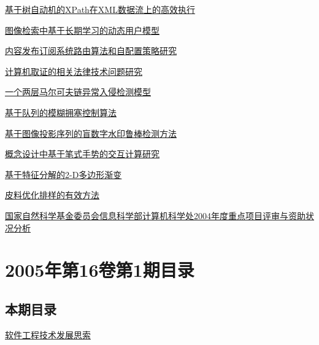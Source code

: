 \documentclass[a4paper]{article}
\begin{document}
\href{http://www.jos.org.cn/ch/reader/download_pdf.aspx?file_no=20050207&year_id=2005&quarter_id=2&falg=1}{基于树自动机的XPath在XML数据流上的高效执行}

\href{http://www.jos.org.cn/ch/reader/download_pdf.aspx?file_no=20050208&year_id=2005&quarter_id=2&falg=1}{图像检索中基于长期学习的动态用户模型}

\href{http://www.jos.org.cn/ch/reader/download_pdf.aspx?file_no=20050210&year_id=2005&quarter_id=2&falg=1}{内容发布订阅系统路由算法和自配置策略研究}

\href{http://www.jos.org.cn/ch/reader/download_pdf.aspx?file_no=20050211&year_id=2005&quarter_id=2&falg=1}{计算机取证的相关法律技术问题研究}

\href{http://www.jos.org.cn/ch/reader/download_pdf.aspx?file_no=20050212&year_id=2005&quarter_id=2&falg=1}{一个两层马尔可夫链异常入侵检测模型}

\href{http://www.jos.org.cn/ch/reader/download_pdf.aspx?file_no=20050213&year_id=2005&quarter_id=2&falg=1}{基于队列的模糊拥塞控制算法}

\href{http://www.jos.org.cn/ch/reader/download_pdf.aspx?file_no=20050214&year_id=2005&quarter_id=2&falg=1}{基于图像投影序列的盲数字水印鲁棒检测方法}

\href{http://www.jos.org.cn/ch/reader/download_pdf.aspx?file_no=20050215&year_id=2005&quarter_id=2&falg=1}{概念设计中基于笔式手势的交互计算研究}

\href{http://www.jos.org.cn/ch/reader/download_pdf.aspx?file_no=20050216&year_id=2005&quarter_id=2&falg=1}{基于特征分解的2-D多边形渐变}

\href{http://www.jos.org.cn/ch/reader/download_pdf.aspx?file_no=20050217&year_id=2005&quarter_id=2&falg=1}{皮料优化排样的有效方法}

\href{http://www.jos.org.cn/ch/reader/download_pdf.aspx?file_no=20050218&year_id=2005&quarter_id=2&falg=1}{国家自然科学基金委员会信息科学部计算机科学处2004年度重点项目评审与资助状况分析}


\section{\textbf{2005年第16卷第1期目录}}
\subsection{本期目录}
\href{http://www.jos.org.cn/ch/reader/download_pdf.aspx?file_no=20050101&year_id=2005&quarter_id=1&falg=1}{软件工程技术发展思索}
\end{document}
